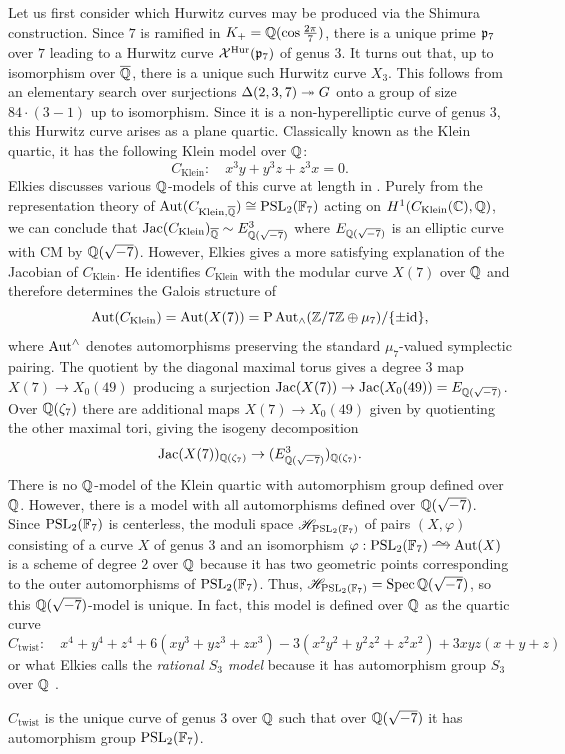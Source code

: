 \documentclass[main.tex]{subfiles}
\begin{document}
Let us first consider which Hurwitz curves may be produced via the Shimura construction.
Since $7$ is ramified in $K_+ = \mathbb{Q}(\cos{\frac{2 \pi}{7}})$, there is a unique prime $\mathfrak{p}_7$ over $7$ leading to a Hurwitz curve $\mathcal{X}^{\mathrm{Hur}}(\mathfrak{p}_{7})$ of genus $3$. It turns out that, up to isomorphism over $\overline{\mathbb{Q}}$, there is a unique such Hurwitz curve $X_3$. This follows from an elementary search over surjections $\Delta(2,3,7) \twoheadrightarrow G$ onto a group of size $84 \cdot (3-1)$ up to isomorphism. Since it is a non-hyperelliptic curve of genus $3$, this Hurwitz curve arises as a plane quartic. Classically known as the Klein quartic, it has the following Klein model over $\mathbb{Q}$:
\[ C_{\mathrm{Klein}} : \quad x^3 y + y^3 z + z^3 x = 0. \]
Elkies discusses various $\mathbb{Q}$-models of this curve at length in \cite{elkies:klein_quartic}. Purely from the representation theory of $\operatorname{\mathrm{Aut}}(C_{\mathrm{Klein}, \overline{\mathbb{Q}}}) \cong \mathrm{PSL}_2(\mathbb{F}_7)$ acting on $H^1(C_{\mathrm{Klein}}(\mathbb{C}), \mathbb{Q})$, we can conclude that $\operatorname{\mathrm{Jac}}(C_{\mathrm{Klein}})_{\overline{\mathbb{Q}}} \sim E_{\mathbb{Q}(\sqrt{-7})}^3$ where $E_{\mathbb{Q}(\sqrt{-7})}$ is an elliptic curve with CM by $\mathbb{Q}(\sqrt{-7})$. However, Elkies gives a more satisfying explanation of the Jacobian of $C_{\mathrm{Klein}}$. He identifies $C_{\mathrm{Klein}}$ with the modular curve $X(7)$ over $\mathbb{Q}$ and therefore determines the Galois structure of
\[ \operatorname{\mathrm{Aut}}(C_{\mathrm{Klein}}) = \operatorname{\mathrm{Aut}}(X(7)) = \mathrm{P}\operatorname{\mathrm{Aut}}_{\wedge}(\mathbb{Z} / 7 \mathbb{Z} \oplus \mu_7) / \{ \pm \mathrm{id} \}, \]
where $\operatorname{\mathrm{Aut}}^{\wedge}$ denotes automorphisms preserving the standard $\mu_7$-valued symplectic pairing. The quotient by the diagonal maximal torus gives a degree $3$ map $X(7) \to X_0(49)$ producing a surjection $\operatorname{\mathrm{Jac}}(X(7)) \to \operatorname{\mathrm{Jac}}(X_0(49)) = E_{\mathbb{Q}(\sqrt{-7})}$. Over $\mathbb{Q}(\zeta_7)$ there are additional maps $X(7) \to X_0(49)$ given by quotienting the other maximal tori, giving the isogeny decomposition
\[ \operatorname{\mathrm{Jac}}(X(7))_{\mathbb{Q}(\zeta_7)} \to (E_{\mathbb{Q}(\sqrt{-7})}^3)_{\mathbb{Q}(\zeta_7)}. \]
There is no $\mathbb{Q}$-model of the Klein quartic with automorphism group defined over $\mathbb{Q}$. However, there is a model with all automorphisms defined over $\mathbb{Q}(\sqrt{-7})$.
Since $\mathrm{PSL}_2(\mathbb{F}_7)$ is centerless, the moduli space $\mathscr{H}_{\mathrm{PSL}_2(\mathbb{F}_7)}$ of pairs $(X, \varphi)$ consisting of a curve $X$ of genus $3$ and an isomorphism $\varphi : \PSL_2(\FF_7) \iso \Aut(X)$ is a scheme of degree $2$ over $\mathbb{Q}$ because it has two geometric points corresponding to the outer automorphisms of $\mathrm{PSL}_2(\mathbb{F}_7)$. Thus, $\mathscr{H}_{\mathrm{PSL}_2(\mathbb{F}_7)} = \operatorname{\mathrm{Spec}}{\mathbb{Q}(\sqrt{-7})}$, so this $\mathbb{Q}(\sqrt{-7})$-model is unique. In fact, this model is defined over $\mathbb{Q}$ as the quartic curve
\[ C_{\mathrm{twist}} : \quad x^4 + y^4 + z^4 + 6(xy^3 + yz^3 + zx^3) - 3(x^2 y^2 + y^2 z^2 + z^2 x^2) + 3xyz(x+y+z) \]
or what Elkies calls the \textit{rational $S_3$ model} because it has automorphism group $S_3$ over $\mathbb{Q}$ \cite[p.59, (1.22)]{elkies:klein_quartic}.
\begin{prop}
$C_{\mathrm{twist}}$ is the unique curve of genus $3$ over $\mathbb{Q}$ such that over $\mathbb{Q}(\sqrt{-7})$ it has automorphism group $\mathrm{PSL}_2(\mathbb{F}_7)$.
\end{prop}
\end{document}
